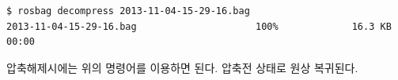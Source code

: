 \begin{lstlisting}[language=ROS]
$ rosbag decompress 2013-11-04-15-29-16.bag 
2013-11-04-15-29-16.bag                     100%             16.3 KB 00:00  
\end{lstlisting}

\noindent
압축해제시에는 위의 명령어를 이용하면 된다. 압축전 상태로 원상 복귀된다.



